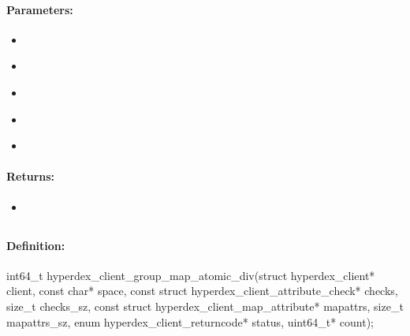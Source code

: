 \paragraph{Parameters:}
\begin{itemize}[noitemsep]
\item {}\\

\item {}\\

\item {}\\

\item {}\\

\item {}\\

\end{itemize}

\paragraph{Returns:}
\begin{itemize}[noitemsep]
\item {}\\

\end{itemize}

\pagebreak
\subsection{}
\label{api:c:group_map_atomic_div}


\paragraph{Definition:}
\begin{ccode}
int64_t hyperdex_client_group_map_atomic_div(struct hyperdex_client* client,
        const char* space,
        const struct hyperdex_client_attribute_check* checks, size_t checks_sz,
        const struct hyperdex_client_map_attribute* mapattrs, size_t mapattrs_sz,
        enum hyperdex_client_returncode* status,
        uint64_t* count);
\end{ccode}

